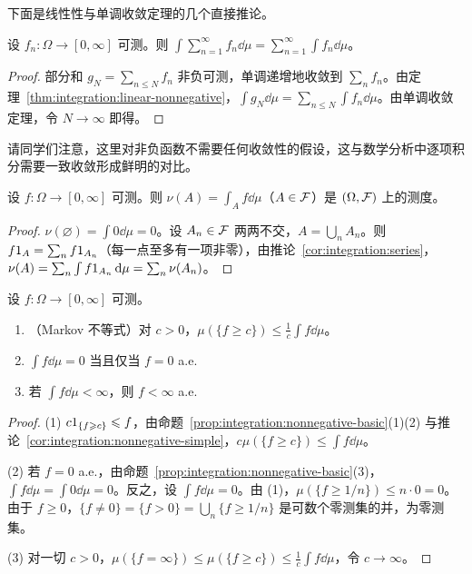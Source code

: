 下面是线性性与单调收敛定理的几个直接推论。

\begin{corollary}[逐项积分]\label{cor:integration:series}
设 $f_n:\Omega\to[0,\infty]$ 可测。则 $\int\sum_{n=1}^\infty f_n\dd\mu=\sum_{n=1}^\infty\int f_n\dd\mu$。
\end{corollary}
\begin{proof}
部分和 $g_N=\sum_{n\leqslant N}f_n$ 非负可测，单调递增地收敛到 $\sum_nf_n$。由定理~\ref{thm:integration:linear-nonnegative}，$\int g_N\dd\mu=\sum_{n\leqslant N}\int f_n\dd\mu$。由单调收敛定理，令 $N\to\infty$ 即得。
\end{proof}

请同学们注意，这里对非负函数不需要任何收敛性的假设，这与数学分析中逐项积分需要一致收敛形成鲜明的对比。

\begin{corollary}[不定积分是测度]\label{cor:integration:indefinite}
设 $f:\Omega\to[0,\infty]$ 可测。则 $\nu(A)=\int_Af\dd\mu$（$A\in\mathcal{F}$）是 $(\Omega,\mathcal{F})$ 上的测度。
\end{corollary}
\begin{proof}
$\nu(\varnothing)=\int0\dd\mu=0$。设 $A_n\in\mathcal{F}$ 两两不交，$A=\bigcup_nA_n$。则 $f1_A=\sum_nf1_{A_n}$（每一点至多有一项非零），由推论~\ref{cor:integration:series}，$\nu(A)=\sum_n\int f1_{A_n}\,\mathrm{d}\mu=\sum_n\nu(A_n)$。
\end{proof}

\begin{proposition}\label{prop:integration:markov}
设 $f:\Omega\to[0,\infty]$ 可测。
\begin{enumerate}
\item （Markov 不等式）对 $c>0$，$\mu(\{f\geqslant c\})\leqslant\frac1c\int f\dd\mu$。
\item $\int f\dd\mu=0$ 当且仅当 $f=0$ a.e.
\item 若 $\int f\dd\mu<\infty$，则 $f<\infty$ a.e.
\end{enumerate}
\end{proposition}
\begin{proof}
(1) $c1_{\{f\geqslant c\}}\leqslant f$，由命题~\ref{prop:integration:nonnegative-basic}(1)(2) 与推论~\ref{cor:integration:nonnegative-simple}，$c\mu(\{f\geqslant c\})\leqslant\int f\dd\mu$。

(2) 若 $f=0$ a.e.，由命题~\ref{prop:integration:nonnegative-basic}(3)，$\int f\dd\mu=\int0\dd\mu=0$。反之，设 $\int f\dd\mu=0$。由 (1)，$\mu(\{f\geqslant1/n\})\leqslant n\cdot0=0$。由于 $f\geqslant0$，$\{f\neq0\}=\{f>0\}=\bigcup_n\{f\geqslant1/n\}$ 是可数个零测集的并，为零测集。

(3) 对一切 $c>0$，$\mu(\{f=\infty\})\leqslant\mu(\{f\geqslant c\})\leqslant\frac1c\int f\dd\mu$，令 $c\to\infty$。
\end{proof}

